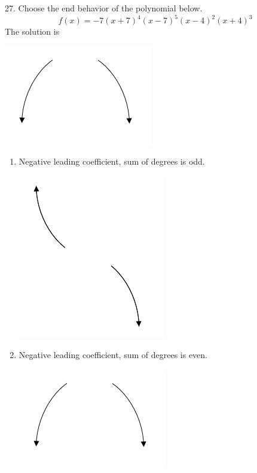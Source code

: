 \documentclass{article}[10pt]
\begin{document}
27. Choose the end behavior of the polynomial below.
$$ f(x) = -7(x + 7)^{4}(x - 7)^{5}(x - 4)^{2}(x + 4)^{3} $$ 
The solution is  
\begin{center}\includegraphics[scale=0.5]{../Figures/endBehaviorNegativeEven.png}\end{center}\begin{enumerate}[label=\Alph*.] 
\item Negative leading coefficient, sum of degrees is odd. 
\begin{center}\includegraphics[scale=0.5]{../Figures/endBehaviorNegativeOdd.png}\end{center} 
 
\item Negative leading coefficient, sum of degrees is even. 
\begin{center}\includegraphics[scale=0.5]{../Figures/endBehaviorNegativeEven.png}\end{center} 
 

\end{enumerate}
\end{document}
